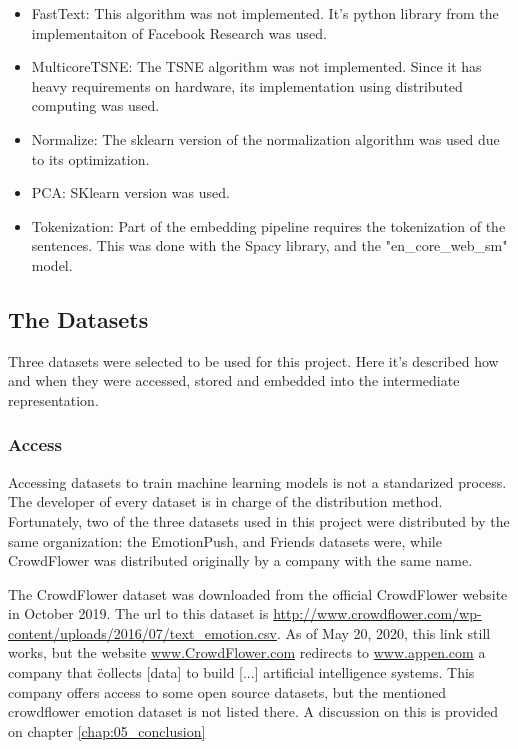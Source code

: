 \begin{itemize}
  \item FastText: This algorithm was not implemented. It's python library from the implementaiton of Facebook Research was used. \cite{TODO}
  \item MulticoreTSNE: The TSNE algorithm was not implemented. Since it has heavy requirements on hardware, its implementation using distributed computing was used. \cite{TODO}
  \item Normalize: The sklearn version of the normalization algorithm was used due to its optimization. \cite{TODO}
  \item PCA: SKlearn version was used. \cite{TODO}
  \item Tokenization: Part of the embedding pipeline requires the tokenization of the sentences. This was done with the Spacy library, and the "en_core_web_sm" model.\cite{TODO}
\end{itemize}

\subsection{The Datasets}\label{sub:The Datasets}
Three datasets were selected to be used for this project. Here it's described how and when they were accessed, stored and embedded into the intermediate representation.

\subsubsection{Access}\label{subs:Access}
Accessing datasets to train machine learning models is not a standarized process. The developer of every dataset is in charge of the distribution method. Fortunately, two of the three datasets used in this project were distributed by the same organization: the EmotionPush, and Friends datasets were, while CrowdFlower was distributed originally by a company with the same name.

The CrowdFlower dataset was downloaded from the official CrowdFlower website in October 2019. The url to this dataset is \url{http://www.crowdflower.com/wp-content/uploads/2016/07/text_emotion.csv}. As of May 20, 2020, this link still works, but the website \url{www.CrowdFlower.com} redirects to \url{www.appen.com} a company that \"collects [data] to build [...] artificial intelligence systems.\"\cite{TODO} This company offers access to some open source datasets, but the mentioned crowdflower emotion dataset is not listed there. A discussion on this is provided on chapter \ref{chap:05_conclusion}

